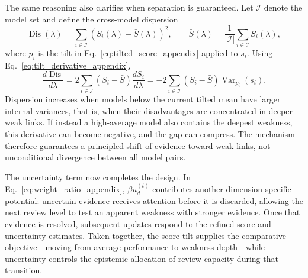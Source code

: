 The same reasoning also clarifies when separation is guaranteed. Let $\mathcal{I}$ denote the model set and define the cross-model dispersion
\begin{equation}
    \operatorname{Dis}(\lambda)
    =
    \sum_{i\in\mathcal{I}}
    \left(S_i(\lambda)-\bar S(\lambda)\right)^2,
    \qquad
    \bar S(\lambda)
    =
    \frac{1}{|\mathcal{I}|}\sum_{i\in\mathcal{I}}S_i(\lambda),
\end{equation}
where $p_i$ is the tilt in Eq.~\eqref{eq:tilted_score_appendix} applied to $s_i$. Using Eq.~\eqref{eq:tilt_derivative_appendix},
\begin{equation}
    \frac{d\operatorname{Dis}}{d\lambda}
    =
    2\sum_{i\in\mathcal{I}}
    \left(S_i-\bar S\right)\frac{dS_i}{d\lambda}
    =
    -2\sum_{i\in\mathcal{I}}
    \left(S_i-\bar S\right)\operatorname{Var}_{p_i}(s_i).
    \label{eq:dispersion_derivative_appendix}
\end{equation}
Dispersion increases when models below the current tilted mean have larger internal variances, that is, when their disadvantages are concentrated in deeper weak links. If instead a high-average model also contains the deepest weakness, this derivative can become negative, and the gap can compress. The mechanism therefore guarantees a principled shift of evidence toward weak links, not unconditional divergence between all model pairs.

The uncertainty term now completes the design. In Eq.~\eqref{eq:weight_ratio_appendix}, $\beta u_d^{(t)}$ contributes another dimension-specific potential: uncertain evidence receives attention before it is discarded, allowing the next review level to test an apparent weakness with stronger evidence. Once that evidence is resolved, subsequent updates respond to the refined score and uncertainty estimates. Taken together, the score tilt supplies the comparative objective—moving from average performance to weakness depth—while uncertainty controls the epistemic allocation of review capacity during that transition.